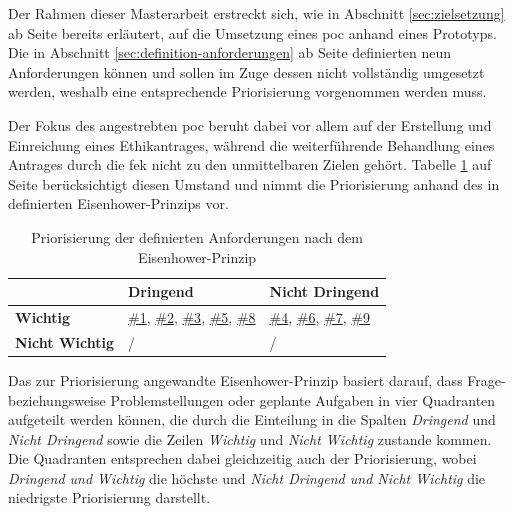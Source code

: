\documentclass[a4paper,12pt,twoside]{scrreprt}
\begin{document}
Der Rahmen dieser Masterarbeit erstreckt sich, wie in Abschnitt \ref{sec:zielsetzung} ab Seite \pageref{sec:zielsetzung} bereits erläutert, auf die Umsetzung eines \ac{poc} anhand eines Prototyps. Die in Abschnitt \ref{sec:definition-anforderungen} ab Seite \pageref{sec:definition-anforderungen} definierten neun Anforderungen können und sollen im Zuge dessen nicht vollständig umgesetzt werden, weshalb eine entsprechende Priorisierung vorgenommen werden muss.

\medskip

Der Fokus des angestrebten \ac{poc} beruht dabei vor allem auf der Erstellung und Einreichung eines Ethikantrages, während die weiterführende Behandlung eines Antrages durch die \ac{fek} nicht zu den unmittelbaren Zielen gehört. Tabelle \ref{tab:priorisierung-anforderungen} auf Seite \pageref{tab:priorisierung-anforderungen} berücksichtigt diesen Umstand und nimmt die Priorisierung anhand des in \cite{chai_what_2020} definierten Eisenhower-Prinzips vor.

\begin{table}[ht!]
    \centering
    \begin{tabular}{p{.15\linewidth} | p{.35\linewidth} | p{.35\linewidth}}
        & \textbf{Dringend} & \textbf{Nicht Dringend} \\
        \hline
        \textbf{Wichtig} & \hyperref[sub-sub-sec:abgeleitete-anforderungen-vorfeld-antrag]{\#1}, \hyperref[sub-sub-sec:abgeleitete-anforderungen-während-erstellung-einreichung]{\#2}, \hyperref[sub-sub-sec:abgeleitete-anforderungen-während-erstellung-einreichung]{\#3}, \hyperref[sub-sub-sec:abgeleitete-anforderungen-während-erstellung-einreichung]{\#5}, \hyperref[sub-sub-sec:abgeleitete-anforderungen-nach-einreichung]{\#8} & \hyperref[sub-sub-sec:abgeleitete-anforderungen-während-erstellung-einreichung]{\#4}, \hyperref[sub-sub-sec:abgeleitete-anforderungen-während-erstellung-einreichung]{\#6}, \hyperref[sub-sub-sec:abgeleitete-anforderungen-nach-einreichung]{\#7}, \hyperref[sub-sub-sec:abgeleitete-anforderungen-nach-einreichung]{\#9} \\
        \hline
        \textbf{Nicht Wichtig} & / & /
    \end{tabular}
    \caption{Priorisierung der definierten Anforderungen nach dem Eisenhower-Prinzip}
    \label{tab:priorisierung-anforderungen}
\end{table}

Das zur Priorisierung angewandte Eisenhower-Prinzip basiert darauf, dass Frage- beziehungsweise Problemstellungen oder geplante Aufgaben in vier Quadranten aufgeteilt werden können, die durch die Einteilung in die Spalten \textit{Dringend} und \textit{Nicht Dringend} sowie die Zeilen \textit{Wichtig} und \textit{Nicht Wichtig} zustande kommen. Die Quadranten entsprechen dabei gleichzeitig auch der Priorisierung, wobei \textit{Dringend und Wichtig} die höchste und \textit{Nicht Dringend und Nicht Wichtig} die niedrigste Priorisierung darstellt. \cite{chai_what_2020}
\end{document}
